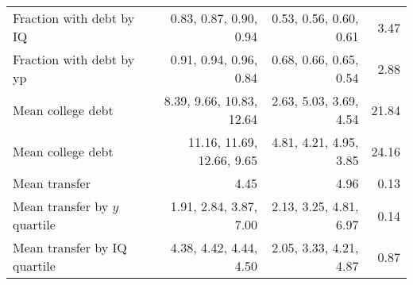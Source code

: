 \begin{tabular}{lrrr}
Fraction with debt by IQ & 0.83, 0.87, 0.90, 0.94  & 0.53, 0.56, 0.60, 0.61  & 3.47  \\ 
Fraction with debt by yp & 0.91, 0.94, 0.96, 0.84  & 0.68, 0.66, 0.65, 0.54  & 2.88  \\ 
Mean college debt & 8.39, 9.66, 10.83, 12.64  & 2.63, 5.03, 3.69, 4.54  & 21.84  \\ 
Mean college debt & 11.16, 11.69, 12.66, 9.65  & 4.81, 4.21, 4.95, 3.85  & 24.16  \\ 
Mean transfer & 4.45  & 4.96  & 0.13  \\ 
Mean transfer by $y$ quartile & 1.91, 2.84, 3.87, 7.00  & 2.13, 3.25, 4.81, 6.97  & 0.14  \\ 
Mean transfer by IQ quartile & 4.38, 4.42, 4.44, 4.50  & 2.05, 3.33, 4.21, 4.87  & 0.87  \\ 
\hline
\end{tabular}%

